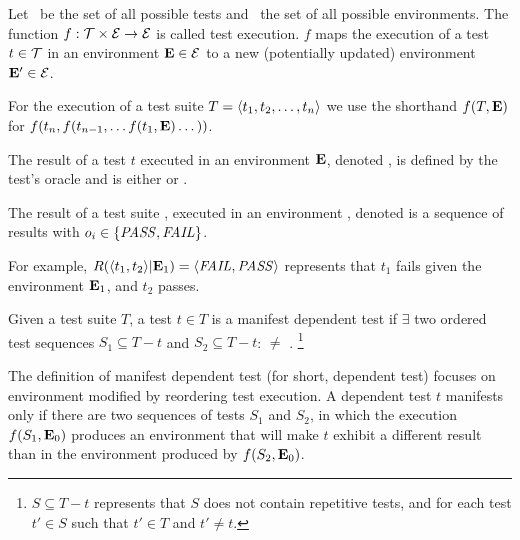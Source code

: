 \begin{definition}
Let\/ \alltests\ be the set of all possible
tests and\/ \environs\ the set of all possible
environments.
The function\/ ${f}: \mathcal{T} \times \mathcal{E} \rightarrow
\mathcal{E}$ is called test
execution. $f$ maps the execution of a test\/ $ t \in
\mathcal{T}$ 
in an environment\/ $\mathbf{E} \in \mathcal{E}$ to a new (potentially updated)
environment\/ $\mathbf{E}' \in \mathcal{E}$.

For the execution of a test suite\/ $T =  \langle t_1, t_2, \dots, t_n \rangle $
we use the shorthand\/
$f(T,\mathbf{E})$ for $f(t_n,f(t_{n-1},\dots f(t_1,\mathbf{E}) \dots ))$.
\end{definition}

\begin{definition}
The result of a test $t$ executed in an environment\/ $\mathbf{E}$,
denoted\/ , is defined by the test's oracle
and is either \pass or \fail.

The result of a test suite\/ , executed in an
environment\/ \env, denoted\/  is a
sequence of results\/  with $o_i \in \{\mathit{PASS},\mathit{FAIL}\}$.


For example, $R( \langle t_1, t_2 \rangle |\mathbf{E}_1) =  \langle \mathit{FAIL}, \mathit{PASS} \rangle $ represents that 
$t_1$ fails given the environment\/ $\mathbf{E}_1$, and\/ $t_2$ passes.
\end{definition}



\begin{definition} \label{def:manifest}
Given a test suite\/ $T$, a test $t \in T$ is a
manifest dependent test if $\exists$ two ordered test sequences ${S_1 \subseteq T - t}$
and ${S_2 \subseteq T - t}$:  $\neq$
.
\footnote{$S \subseteq T - t$ represents that $S$ does not
contain repetitive tests, and for each
test $t' \in S$ such that $t' \in T$ and $t' \neq t$.}
\end{definition}

The definition of manifest dependent test (for short, dependent test)
focuses on environment modified by reordering test execution.
A dependent test $t$ manifests only
if there are two sequences of tests $S_1$ and $S_2$, in which the execution
$f(S_1,\mathbf{E}_0)$  produces an
environment that will make $t$ exhibit a
different result than in the environment produced by $f(S_2,\mathbf{E}_0)$.


